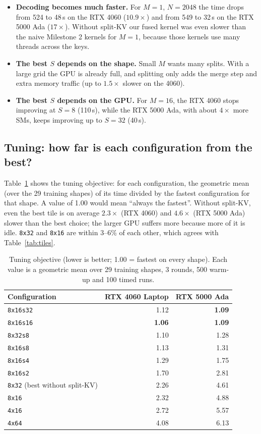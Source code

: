 \documentclass[11pt]{article}
\begin{document}
\begin{itemize}
  \item \textbf{Decoding becomes much faster.} For $M = 1$, $N = 2048$ the time
        drops from 524 to 48\,\textmu s on the RTX 4060 ($10.9\times$) and from 549 to
        32\,\textmu s on the RTX 5000 Ada ($17\times$). Without split-KV our fused kernel
        was even slower than the naive Milestone 2 kernels for $M = 1$,
        because those kernels use many threads across the keys.
  \item \textbf{The best $S$ depends on the shape.} Small $M$ wants many splits.
        With a large grid the GPU is already full, and splitting only adds the
        merge step and extra memory traffic (up to $1.5\times$ slower on the 4060).
  \item \textbf{The best $S$ depends on the GPU.} For $M = 16$, the RTX 4060
        stops improving at $S = 8$ (110\,\textmu s), while the RTX 5000 Ada, with about
        $4\times$ more SMs, keeps improving up to $S = 32$ (40\,\textmu s).
\end{itemize}

\subsection{Tuning: how far is each configuration from the best?}
Table~\ref{tab:tuning} shows the tuning objective: for each configuration,
the geometric mean (over the 29 training shapes) of its time divided by the
fastest configuration for that shape. A value of 1.00 would mean ``always the
fastest''. Without split-KV, even the best tile is on average $2.3\times$
(RTX 4060) and $4.6\times$ (RTX 5000 Ada) slower than the best choice; the
larger GPU suffers more because more of it is idle. \texttt{8x32} and
\texttt{8x16} are within 3--6\% of each other, which agrees with
Table~\ref{tab:tiles}.

\begin{table}[H]
\centering
\caption{Tuning objective (lower is better; 1.00 = fastest on every shape).
Each value is a geometric mean over 29 training shapes, 3 rounds, 500 warm-up and 100 timed runs.}
\label{tab:tuning}
\begin{tabular}{lrr}
\toprule
Configuration & RTX 4060 Laptop & RTX 5000 Ada \\
\midrule
\texttt{8x16s32} & 1.12 & \textbf{1.09} \\
\texttt{8x16s16} & \textbf{1.06} & \textbf{1.09} \\
\texttt{8x32s8}  & 1.10 & 1.28 \\
\texttt{8x16s8}  & 1.13 & 1.31 \\
\texttt{8x16s4}  & 1.29 & 1.75 \\
\texttt{8x16s2}  & 1.70 & 2.81 \\
\midrule
\texttt{8x32} (best without split-KV) & 2.26 & 4.61 \\
\texttt{8x16} & 2.32 & 4.88 \\
\texttt{4x16} & 2.72 & 5.57 \\
\texttt{4x64} & 4.08 & 6.13 \\
\bottomrule
\end{tabular}
\end{table}
\end{document}
